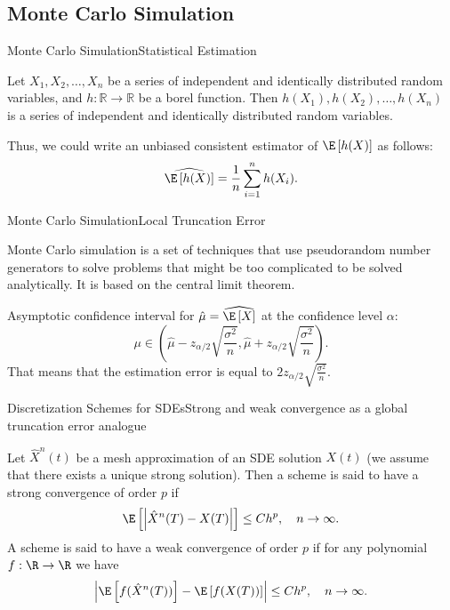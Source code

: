 \subsection{Monte Carlo Simulation}
    \begin{frame}{Monte Carlo Simulation}{Statistical Estimation}
        \begin{lemma}
            Let $X_1, X_2, \dots, X_n$ be a series of independent and identically distributed random variables, and $h: \mathbb{R} \to \mathbb{R}$ be a borel function. Then $h(X_1), h(X_2), \dots, h(X_n)$ is a series of independent and identically distributed random variables.
        \end{lemma}
        Thus, we could write an unbiased consistent estimator of $\E \left[h(X)\right]$ as follows:
        \begin{equation}
            \widehat{\E \left[h(X)\right]} = \frac{1}{n} \sum_{i=1}^n h(X_i).
        \end{equation}
    \end{frame}

    \begin{frame}{Monte Carlo Simulation}{Local Truncation Error}
        \begin{definition}
            Monte Carlo simulation is a set of techniques that use pseudorandom number generators to solve problems that might be too complicated to be solved analytically. It is based on the central limit theorem.
        \end{definition}
        Asymptotic confidence interval for $\hat{\mu} = \widehat{\E\left[X\right]}$ at the confidence level $\alpha$:
        \begin{equation}
            \mu \in \left(\hat{\mu} - z_{\alpha/2} \sqrt{\frac{\sigma^2}{n}}, \hat{\mu} + z_{\alpha/2} \sqrt{\frac{\sigma^2}{n}}\right).
        \end{equation}
        That means that the estimation error is equal to $2z_{\alpha/2} \sqrt{\frac{\sigma^2}{n}}$.
    \end{frame}

    \begin{frame}{Discretization Schemes for SDEs}{Strong and weak convergence as a global truncation error analogue}
        \begin{definition}
            Let $\hat X^n(t)$ be a mesh approximation of an SDE solution $X(t)$ (we assume that there exists a unique strong solution). 
            Then a scheme is said to have a strong convergence of order $p$ if 
            \begin{equation}
                \E\left[\left|\hat X^n(T) - X(T)\right|\right] \leq Ch^p, \quad n \to \infty.
            \end{equation}
            A scheme is said to have a weak convergence of order $p$ if for any polynomial $f: \R \to \R$ we have
            \begin{equation}
                \left|\E\left[f(\hat X^n(T))\right] - \E\left[f(X(T))\right]\right| \leq Ch^p, \quad n \to \infty.
            \end{equation}
        \end{definition}
    \end{frame}
